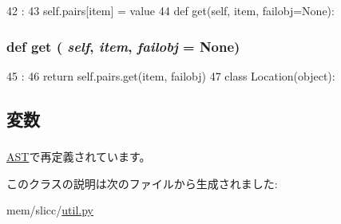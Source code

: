\begin{DoxyCode}
42                                       :
43         self.pairs[item] = value
44 
    def get(self, item, failobj=None):
\end{DoxyCode}
\hypertarget{classslicc_1_1util_1_1PairContainer_a444a1328efb32d5d9d2dcb2efe855d3b}{
\subsubsection[{get}]{\setlength{\rightskip}{0pt plus 5cm}def get ( {\em self}, \/   {\em item}, \/   {\em failobj} = {\ttfamily None})}}
\label{classslicc_1_1util_1_1PairContainer_a444a1328efb32d5d9d2dcb2efe855d3b}



\begin{DoxyCode}
45                                      :
46         return self.pairs.get(item, failobj)
47 
class Location(object):
\end{DoxyCode}


\subsection{変数}
\hypertarget{classslicc_1_1util_1_1PairContainer_a8b16b1e1994f9c318702b801bd3b8420}{
\subsubsection[{pairs}]{}}
\label{classslicc_1_1util_1_1PairContainer_a8b16b1e1994f9c318702b801bd3b8420}


\hyperlink{classslicc_1_1ast_1_1AST_1_1AST_a8b16b1e1994f9c318702b801bd3b8420}{AST}で再定義されています。

このクラスの説明は次のファイルから生成されました:\begin{DoxyCompactItemize}
\item 
mem/slicc/\hyperlink{util_8py}{util.py}\end{DoxyCompactItemize}
